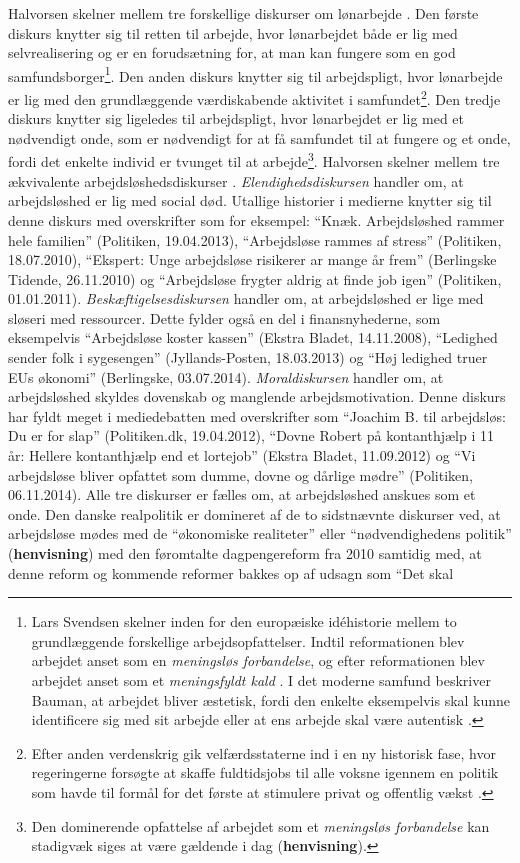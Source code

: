 Halvorsen skelner mellem tre forskellige diskurser om lønarbejde \parencite[13]{Halvorsen1999}. Den første diskurs knytter sig til retten til arbejde, hvor lønarbejdet både er lig med selvrealisering og er en forudsætning for, at man kan fungere som en god samfundsborger\footnote{Lars Svendsen skelner inden for den europæiske idéhistorie mellem to grundlæggende forskellige arbejdsopfattelser. Indtil reformationen blev arbejdet anset som en \textit{meningsløs forbandelse}, og efter reformationen blev arbejdet anset som et \textit{meningsfyldt kald} \parencite[13]{Svendsen2008}. I det moderne samfund beskriver Bauman, at arbejdet bliver æstetisk, fordi den enkelte eksempelvis skal kunne identificere sig med sit arbejde eller at ens arbejde skal være autentisk \textbf{\parencite[?]{Baum2006}}.}. Den anden diskurs knytter sig til arbejdspligt, hvor lønarbejde er lig med den grundlæggende værdiskabende aktivitet i samfundet\footnote{Efter anden verdenskrig gik velfærdsstaterne ind i en ny historisk fase, hvor regeringerne forsøgte at skaffe fuldtidsjobs til alle voksne igennem en politik som havde til formål for det første at stimulere privat og offentlig vækst \parencite[17]{Keane1986}.}. Den tredje diskurs knytter sig ligeledes til arbejdspligt, hvor lønarbejdet er lig med et nødvendigt onde, som er nødvendigt for at få samfundet til at fungere og et onde, fordi det enkelte individ er tvunget til at arbejde\footnote{Den dominerende opfattelse af arbejdet som et \textit{meningsløs forbandelse} \parencite[13]{Svendsen2008} kan stadigvæk siges at være gældende i dag (\textbf{henvisning}).}. Halvorsen skelner mellem tre ækvivalente arbejdsløshedsdiskurser \parencite[13]{Halvorsen1999}. \textit{Elendighedsdiskursen} handler om, at arbejdsløshed er lig med social død. Utallige historier i medierne knytter sig til denne diskurs med overskrifter som for eksempel: “Knæk. Arbejdsløshed rammer hele familien” (Politiken, 19.04.2013), “Arbejdsløse rammes af stress” (Politiken, 18.07.2010), “Ekspert: Unge arbejdsløse risikerer ar mange år frem” (Berlingske Tidende, 26.11.2010) og “Arbejdsløse frygter aldrig at finde job igen” (Politiken, 01.01.2011). \textit{Beskæftigelsesdiskursen} handler om, at arbejdsløshed er lige med sløseri med ressourcer. Dette fylder også en del i finansnyhederne, som eksempelvis “Arbejdsløse koster kassen” (Ekstra Bladet, 14.11.2008), “Ledighed sender folk i sygesengen” (Jyllands-Posten, 18.03.2013) og “Høj ledighed truer EUs økonomi” (Berlingske, 03.07.2014). \textit{Moraldiskursen} handler om, at arbejdsløshed skyldes dovenskab og manglende arbejdsmotivation. Denne diskurs har fyldt meget i mediedebatten med overskrifter som “Joachim B. til arbejdsløs: Du er for slap” (Politiken.dk, 19.04.2012), “Dovne Robert på kontanthjælp i 11 år: Hellere kontanthjælp end et lortejob” (Ekstra Bladet, 11.09.2012) og “Vi arbejdsløse bliver opfattet som dumme, dovne og dårlige mødre” (Politiken, 06.11.2014). Alle tre diskurser er fælles om, at arbejdsløshed anskues som et onde. Den danske realpolitik er domineret af de to sidstnævnte diskurser ved, at arbejdsløse mødes med de “økonomiske realiteter” eller “nødvendighedens politik” (\textbf{henvisning}) med den føromtalte dagpengereform fra 2010 samtidig med, at denne reform og kommende reformer bakkes op af udsagn som “Det skal 